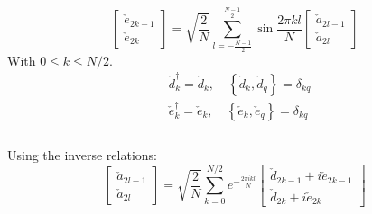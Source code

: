 \documentclass[12pt,a4paper]{book}
\theoremstyle{definition}
\begin{document}
\begin{equation}\label{eq:edefinition}\left[\begin{array}{c}
		\check{e}_{2 k-1} \\
		\check{e}_{2 k}
	\end{array}\right]=\sqrt{\frac{2}{N}} \sum_{l=-\frac{N-1}{2}}^{\frac{N-1}{2}} \sin \frac{2 \pi k l}{N}\left[\begin{array}{c}
		\check{a}_{2 l-1} \\
		\check{a}_{2 l}
	\end{array}\right]\end{equation}	
With $0\le k \le N/2$. \\
\begin{equation}\begin{aligned}
		&\check{d}_{k}^{\dagger}=\check{d}_{k}, \quad\left\{\check{d}_{k}, \check{d}_{q}\right\}=\delta_{k q}\\
		&\check{e}_{k}^{\dagger}=\check{e}_{k}, \quad\left\{\check{e}_{k}, \check{e}_{q}\right\}=\delta_{k q}\\
	\end{aligned}	
\end{equation} \\ 
Using the inverse relations:
\begin{equation}\left[\begin{array}{c}
		\check{a}_{2 l-1} \\
		\check{a}_{2 l}
	\end{array}\right]=\sqrt{\frac{2}{N}} \sum_{k=0}^{N/2} e^{-\frac{2 \pi i k l}{N}}\left[\begin{array}{c}
		\check{d}_{2 k-1}+i\check{e}_{2 k-1} \\
		\check{d}_{2 k}+i\check{e}_{2 k}
	\end{array}\right]
\end{equation}
\end{document}
